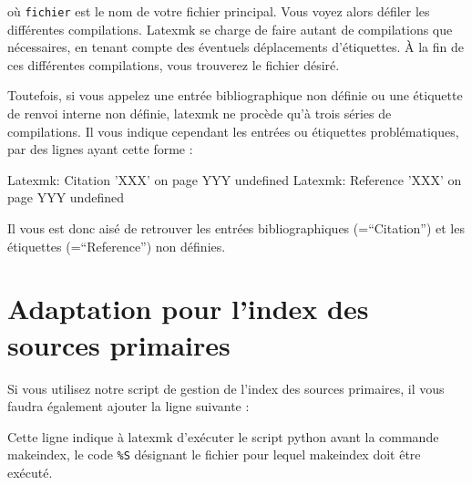 où \verb|fichier| est le nom de votre fichier principal. Vous voyez alors défiler les différentes compilations. Latexmk se charge de faire autant de compilations que nécessaires, en tenant compte des éventuels déplacements d'étiquettes. À la fin de ces différentes compilations, vous trouverez le fichier  désiré.

Toutefois, si vous appelez une entrée bibliographique non définie ou une étiquette de renvoi interne non définie, latexmk ne procède qu'à trois séries de compilations. Il vous indique cependant les entrées ou étiquettes problématiques, par des lignes ayant cette forme :
\begin{bashcode}
Latexmk: Citation 'XXX' on page YYY undefined 
Latexmk: Reference 'XXX' on page YYY undefined 
\end{bashcode}

Il vous est donc aisé de retrouver les entrées bibliographiques (=\enquote{Citation}) et les étiquettes (=\enquote{Reference}) non définies.

\section{Adaptation pour l'index des sources primaires}

Si vous utilisez notre script de gestion de l'index des sources primaires, il vous faudra également ajouter la ligne suivante :

Cette ligne indique à latexmk d'exécuter le script python avant la commande makeindex, le code \verb|%S| désignant le fichier pour lequel makeindex doit être exécuté.
